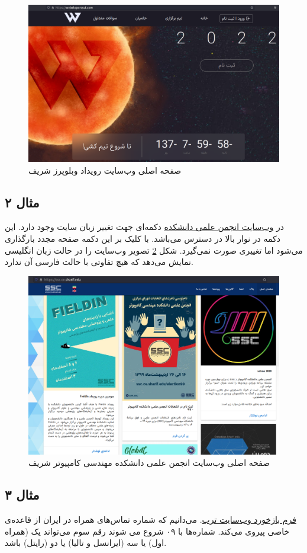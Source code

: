 {\begin{figure}[H]
	\centering
	\includegraphics[width=0.7\linewidth]{figs/bug1}
	\caption[صفحه اصلی وب‌سایت رویداد وبلوپرز شریف]{صفحه اصلی وب‌سایت رویداد وبلوپرز شریف}
	\label{fig:bug1}
\end{figure}


\subsection*{مثال ۲}


در \href{ssc.ce.sharif.edu}{وب‌سایت انجمن علمی دانشکده} دکمه‌ای جهت تغییر زبان سایت وجود دارد. این دکمه در نوار بالا در دسترس می‌باشد. با کلیک بر این دکمه صفحه مجدد بارگذاری می‌شود اما تغییری صورت نمی‌گیرد.
شکل \ref{fig:bug2} تصویر وب‌سایت را در حالت زبان انگلیسی نمایش می‌دهد که هیچ تفاوتی با حالت فارسی ‌آن ندارد.
\begin{figure}[H]
	\centering
	\includegraphics[width=0.7\linewidth]{figs/bug2}
	\caption[صفحه اصلی وب‌سایت انجمن علمی دانشکده مهندسی کامپیوتر شریف]{صفحه اصلی وب‌سایت انجمن علمی دانشکده مهندسی کامپیوتر شریف}
	\label{fig:bug2}
\end{figure}


\subsection*{مثال ۳}
\href{https://torob.com/feedback/}{فرم بازخورد وب‌سایت ترب}.
می‌دانیم که شماره تماس‌های همراه در ایران از قاعده‌ی خاصی پیروی می‌کند. شماره‌ها با ۰۹ شروع می شوند رقم سوم  می‌تواند یک (همراه اول) یا سه (ایرانسل و تالیا) یا دو (رایتل) باشد. \cite{phoneregex}

}
